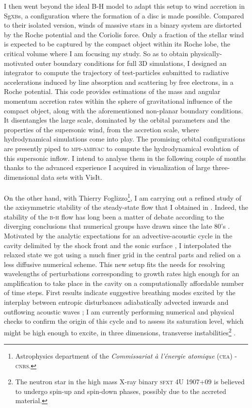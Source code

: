 \documentclass[a4paper,12pt,onecolumn]{article}
\begin{document}
\indent I then went beyond the ideal B-H model to adapt this setup to wind accretion in Sg\textsc{xb}s, a configuration where the formation of a disc is made possible. Compared to their isolated version, winds of massive stars in a binary system are distorted by the Roche potential and the Coriolis force. Only a fraction of the stellar wind is expected to be captured by the compact object within its Roche lobe, the critical volume where I am focusing my study. So as to obtain physically-motivated outer boundary conditions for full 3D simulations, I designed an integrator to compute the trajectory of test-particles submitted to radiative accelerations induced by line absorption and scattering by free electrons, in a Roche potential. This code provides estimations of the mass and angular momentum accretion rates within the sphere of gravitational influence of the compact object, along with the aforementioned non-planar boundary conditions. It disentangles the large scale, dominated by the orbital parameters and the properties of the supersonic wind, from the accretion scale, where hydrodynamical simulations come into play. The promising orbital configurations are presently piped to \textsc{mpi-amrvac} to compute the hydrodynamical evolution of this supersonic inflow. I intend to analyse them in the following couple of months thanks to the advanced experience I acquired in visualization of large three-dimensional data sets with VisIt.\\
\\
\indent On the other hand, with Thierry Foglizzo\footnote{Astrophysics department of the \textit{Commissariat \`a l'\'energie atomique} (\textsc{cea}) - \textsc{cnrs}.}, I am carrying out a refined study of the axisymmetric stability of the steady-state flow that I obtained in \cite{ElMellah2015}. Indeed, the stability of the \textsc{b-h} flow has long been a matter of debate according to the diverging conclusions that numerical groups have drawn since the late 80's \cite{Foglizzo2005}. Motivated by the analytic expectations for an advective-acoustic cycle in the cavity delimited by the shock front and the sonic surface \citep{Foglizzo2009}, I interpolated the relaxed state we got using a much finer grid in the central parts and relied on a less diffusive numerical scheme. This new setup fits the needs for resolving wavelengths of perturbations corresponding to growth rates high enough for an amplification to take place in the cavity on a computationally affordable number of time steps. First results indicate suggestive breathing modes excited by the interplay between entropic disturbances adiabatically advected inwards and outflowing acoustic waves ; I am currently performing numerical and physical checks to confirm the origin of this cycle and to assess its saturation level, which might be high enough to excite, in three dimensions, transverse instabilities\footnote{The neutron star in the high mass X-ray binary \textsc{sfxt} 4U 1907+09 is believed to undergo spin-up and spin-down phases, possibly due to the accreted material.} \cite{Blondin:2012vf}.\\
\end{document}
